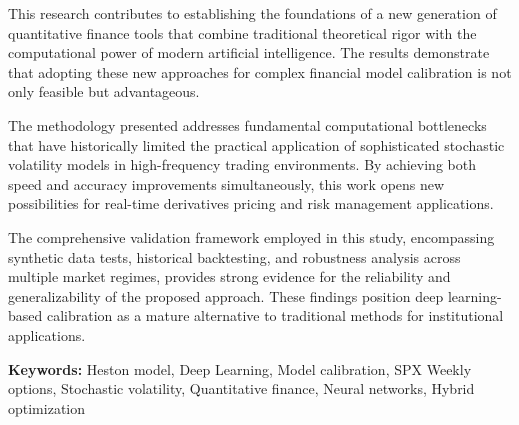 This research contributes to establishing the foundations of a new generation of quantitative finance tools that combine traditional theoretical rigor with the computational power of modern artificial intelligence. The results demonstrate that adopting these new approaches for complex financial model calibration is not only feasible but advantageous.

The methodology presented addresses fundamental computational bottlenecks that have historically limited the practical application of sophisticated stochastic volatility models in high-frequency trading environments. By achieving both speed and accuracy improvements simultaneously, this work opens new possibilities for real-time derivatives pricing and risk management applications.

The comprehensive validation framework employed in this study, encompassing synthetic data tests, historical backtesting, and robustness analysis across multiple market regimes, provides strong evidence for the reliability and generalizability of the proposed approach. These findings position deep learning-based calibration as a mature alternative to traditional methods for institutional applications.

\textbf{Keywords:} Heston model, Deep Learning, Model calibration, SPX Weekly options, Stochastic volatility, Quantitative finance, Neural networks, Hybrid optimization
